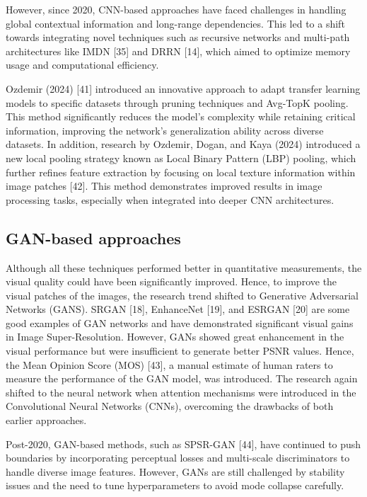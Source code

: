 \documentclass[twocolumn]{svjour3}          %
\begin{document}
However, since 2020, CNN-based approaches have faced challenges in handling global contextual information and long-range dependencies. This led to a shift towards integrating novel techniques such as recursive networks and multi-path architectures like IMDN [35] and DRRN [14], which aimed to optimize memory usage and computational efficiency.

Ozdemir (2024) [41] introduced an innovative approach to adapt transfer learning models to specific datasets through pruning techniques and Avg-TopK pooling. This method significantly reduces the model’s complexity while retaining critical information, improving the network's generalization ability across diverse datasets. In addition, research by Ozdemir, Dogan, and Kaya (2024) introduced a new local pooling strategy known as Local Binary Pattern (LBP) pooling, which further refines feature extraction by focusing on local texture information within image patches [42]. This method demonstrates improved results in image processing tasks, especially when integrated into deeper CNN architectures.

\subsection{GAN-based approaches}
Although all these techniques performed better in quantitative measurements, the visual quality could have been significantly improved. Hence, to improve the visual patches of the images, the research trend shifted to Generative Adversarial Networks (GANS). SRGAN [18], EnhanceNet [19], and ESRGAN [20] are some good examples of GAN networks and have demonstrated significant visual gains in Image Super-Resolution. However, GANs showed great enhancement in the visual performance but were insufficient to generate better PSNR values. Hence, the Mean Opinion Score (MOS) [43], a manual estimate of human raters to measure the performance of the GAN model, was introduced. The research again shifted to the neural network when attention mechanisms were introduced in the Convolutional Neural Networks (CNNs), overcoming the drawbacks of both earlier approaches. 

Post-2020, GAN-based methods, such as SPSR-GAN [44], have continued to push boundaries by incorporating perceptual losses and multi-scale discriminators to handle diverse image features. However, GANs are still challenged by stability issues and the need to tune hyperparameters to avoid mode collapse carefully.
\end{document}
